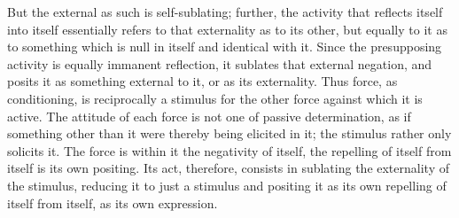 But the external as such is self-sublating; further, the activity that reflects
itself into itself essentially refers to that externality as to its other, but
equally to it as to something which is null in itself and identical with it.
Since the presupposing activity is equally immanent reflection, it sublates
that external negation, and posits it as something external to it, or as its
externality. Thus force, as conditioning, is reciprocally a stimulus for the
other force against which it is active. The attitude of each force is not one
of passive determination, as if something other than it were thereby being
elicited in it; the stimulus rather only solicits it. The force is within it the
negativity of itself, the repelling of itself from itself is its own positing. Its
act, therefore, consists in sublating the externality of the stimulus, reducing
it to just a stimulus and positing it as its own repelling of itself from itself,
as its own expression.

